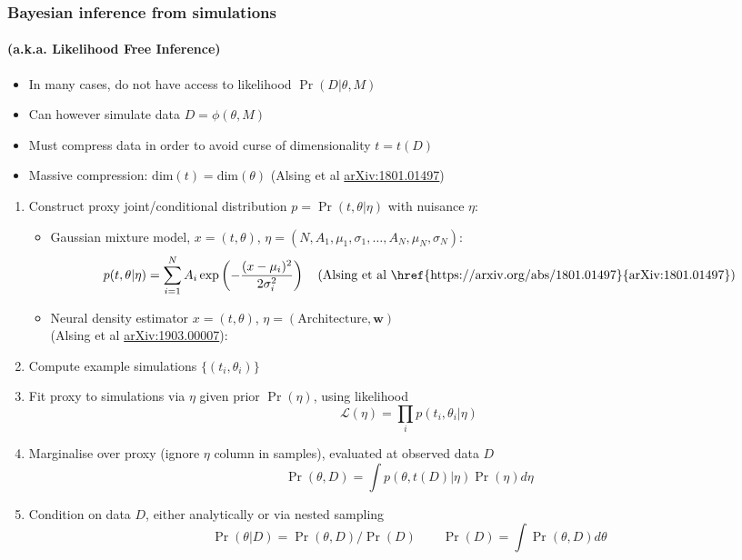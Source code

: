 \documentclass[%
    9pt,
]{beamer}
\newcommand{\black}[1]{\textcolor{black}{#1}}
\newcommand{\arxiv}[1]{\href{https://arxiv.org/abs/#1}{arXiv:#1}}
\begin{document}
\begin{frame}
    \frametitle{Bayesian inference from simulations}
    \framesubtitle{(a.k.a. Likelihood Free Inference)}

    \begin{itemize}
        \item In many cases, do not have access to likelihood $\Pr(D|\theta,M)$
        \item Can however simulate data $D=\phi(\theta,M)$
        \item Must compress data in order to avoid curse of dimensionality $t = t(D)$
        \item Massive compression: $\mathrm{dim}(t)=\mathrm{dim}(\theta)$ (Alsing et al \arxiv{1801.01497})
    \end{itemize}
    \begin{enumerate}
        \item Construct proxy joint/conditional distribution $p=\Pr(t,\theta|\eta)$ with nuisance $\eta$:
            \begin{itemize}
                \item Gaussian mixture model, $x=(t,\theta)$, $\eta = (N, A_1,\mu_1,\sigma_1,\ldots,A_N,\mu_N, \sigma_N)$: 
                    \[p(t,\theta|\eta) = \sum_{i=1}^N A_i\exp\left(-\frac{(x-\mu_i)^2}{2\sigma_i^2}\right) \quad \text{\black{(Alsing et al \arxiv{1801.01497})}}\]
                    \vspace{-5pt}
                \item Neural density estimator $x=(t,\theta)$, $\eta = (\mathrm{Architecture}, \mathbf{w})$ \\(Alsing et al \arxiv{1903.00007}): 
            \end{itemize}
        \item Compute example simulations $\{(t_i, \theta_i)\}$
        \item Fit proxy to simulations via $\eta$ given prior $\Pr(\eta)$, using likelihood
            \[\mathcal{L}(\eta) = \prod_i p(t_i,\theta_i|\eta) \]
            \vspace{-10pt}
        \item Marginalise over proxy (ignore $\eta$ column in samples), evaluated at observed data $D$
            \[\Pr(\theta,D) = \int p(\theta,t(D)|\eta)\Pr(\eta) d\eta \]
            \vspace{-10pt}
        \item Condition on data $D$, either analytically or via nested sampling
            \vspace{-3pt}
            \[\Pr(\theta|D) = \Pr(\theta,D)/\Pr(D) \qquad \Pr(D) = \int \Pr(\theta,D) d\theta\]
    \end{enumerate}
\end{frame}
\end{document}
